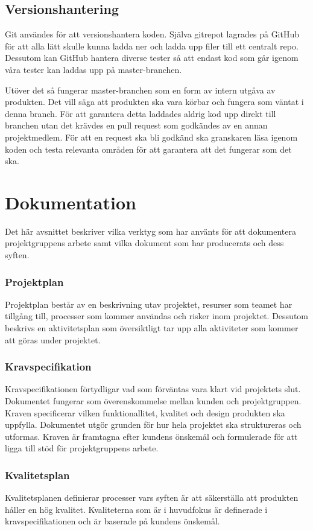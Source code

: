 \subsection{Versionshantering}
Git användes för att versionshantera koden. Själva gitrepot lagrades på GitHub för att alla lätt skulle kunna ladda ner och ladda upp filer till ett centralt repo. Dessutom kan GitHub hantera diverse tester så att endast kod som går igenom våra tester kan laddas upp på master-branchen.

Utöver det så fungerar master-branchen som en form av intern utgåva av produkten. Det vill säga att produkten ska vara körbar och fungera som väntat i denna branch. För att garantera detta laddades aldrig kod upp direkt till branchen utan det krävdes en pull request som godkändes av en annan projektmedlem. För att en request ska bli godkänd ska granskaren läsa igenom koden och testa relevanta områden för att garantera att det fungerar som det ska.

\section{Dokumentation}
\label{sec:method-documentation}
Det här avsnittet beskriver vilka verktyg som har använts för att dokumentera projektgruppens arbete samt vilka dokument som har producerats och dess syften.

\subsubsection*{Projektplan}
Projektplan består av en beskrivning utav projektet, resurser som teamet har tillgång till, processer som kommer användas och risker inom projektet.
Dessutom beskrivs en aktivitetsplan som översiktligt tar upp alla aktiviteter som kommer att
göras under projektet.

\subsubsection*{Kravspecifikation}
Kravspecifikationen förtydligar vad som förväntas vara klart vid projektets slut. Dokumentet fungerar som överenskommelse mellan kunden och projektgruppen. Kraven specificerar vilken funktionallitet, kvalitet och design produkten ska uppfylla. Dokumentet utgör grunden för hur hela projektet ska struktureras och utformas. Kraven är framtagna efter kundens önskemål och formulerade för att ligga till stöd för projektgruppens arbete.

\subsubsection*{Kvalitetsplan}
Kvalitetsplanen definierar processer vars syften är att säkerställa att produkten håller en hög kvalitet. Kvaliteterna som är i huvudfokus är definerade i kravspecifikationen och är baserade på kundens önskemål.

